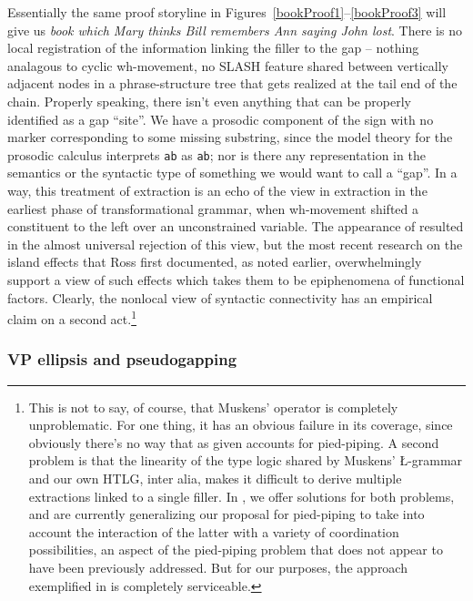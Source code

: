 \documentclass[output=paper,colorlinks,citecolor=brown]{langscibook}
\begin{document}
Essentially the same proof storyline in Figures~\ref{bookProof1}--\ref{bookProof3}
will give us \textit{book which Mary thinks Bill remembers Ann saying
John lost}. There is no local registration of the information linking
the filler to the gap -- nothing analagous to cyclic wh\hyp movement, no
SLASH feature shared between vertically adjacent nodes in a
phrase-structure tree that gets realized at the tail end of the
chain. Properly speaking, there isn't even anything that can be
properly identified as a gap ``site''. We have a prosodic component of
the sign with no marker corresponding to some missing substring, since
the model theory for the prosodic calculus interprets \texttt{a\circ b\circ \E{}} as
\texttt{a\circ b}; nor is there any representation in the semantics or the
syntactic type of something we would want to call a ``gap''. In a way,
this treatment of extraction is an echo of the view in extraction in
the earliest phase of transformational grammar, when wh-movement
shifted a constituent to the left over an unconstrained variable. The
appearance of \citet{ross67} resulted in the almost universal rejection of
this view, but the most recent research on the island effects that
Ross first documented, as noted earlier, overwhelmingly support a view
of such effects which takes them to be epiphenomena of functional
factors. Clearly, the nonlocal view of syntactic connectivity has an
empirical claim on a second act.\footnote{This is not to say, of
course, that Muskens' operator is completely unproblematic. For one
thing, it has an obvious failure in its coverage, since obviously
there's no way that  as given accounts for pied-piping. A
second problem is that the linearity of the type logic shared by
Muskens' \L-grammar and our own HTLG, inter alia, makes it difficult
to derive multiple extractions linked to a single filler. In \citet{kubotalevineBook},
we offer solutions for both problems, and are currently generalizing
our proposal for pied-piping to take into account the interaction of
the latter with a variety of coordination possibilities, an aspect of
the pied-piping problem that does not appear to have been previously
addressed. But for our purposes, the approach exemplified in 
is completely serviceable.}

\subsubsection{VP ellipsis and pseudogapping}\label{subsubsec:VPE}
\end{document}
